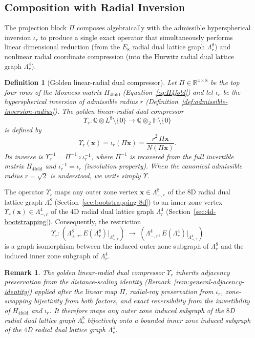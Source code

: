\documentclass{article}
\newtheorem{definition}{Definition}
\newtheorem{remark}{Remark}
\begin{document}
\subsection{Composition with Radial Inversion}
\label{sec:h4-folding:dual-wield}

The projection block \(\Pi\) composes algebraically with the admissible hyperspherical inversion \(\iota_r\) to produce a single exact operator that simultaneously performs linear dimensional reduction (from the \(E_8\) radial dual lattice graph \(\Lambda_r^8\)) and nonlinear radial coordinate compression (into the Hurwitz radial dual lattice graph \(\Lambda_r^4\)).

\begin{definition}[Golden linear-radial dual compressor]
\label{def:golden-linear-radial-dual-compressor}
Let \(\Pi \in \mathbb{R}^{4\times 8}\) be the top four rows of the Moxness matrix \(H_{4\mathrm{fold}}\) (Equation~\eqref{eq:H4fold}) and let \(\iota_r\) be the hyperspherical inversion of admissible radius \(r\) (Definition~\ref{def:admissible-inversion-radius}). The \emph{golden linear-radial dual compressor}
\[
\Upsilon_r \colon \mathbb{Q}\otimes L^8 \setminus \{0\} \to \mathbb{Q}\otimes_{\mathbb{Z}}\mathbb{H} \setminus \{0\}
\]
is defined by
\[
\Upsilon_r(\mathbf{x}) = \iota_r(\Pi\mathbf{x}) = \frac{r^2 \, \Pi\mathbf{x}}{N(\Pi\mathbf{x})}.
\]
Its inverse is \(\Upsilon_r^{-1} = \Pi^{-1} \circ \iota_r^{-1}\), where \(\Pi^{-1}\) is recovered from the full invertible matrix \(H_{4\mathrm{fold}}\) and \(\iota_r^{-1} = \iota_r\) (involution property). When the canonical admissible radius \(r = \sqrt{2}\) is understood, we write simply \(\Upsilon\).
\end{definition}

The operator \(\Upsilon_r\) maps any outer zone vertex \(\mathbf{x} \in \Lambda_{+,r}^8\) of the \(8\)D radial dual lattice graph \(\Lambda_r^8\) (Section~\ref{sec:bootstrapping-8d}) to an inner zone vertex \(\Upsilon_r(\mathbf{x}) \in \Lambda_{-,r}^4\) of the \(4\)D radial dual lattice graph \(\Lambda_r^4\) (Section~\ref{sec:4d-bootstrapping}). Consequently, the restriction
\[
\Upsilon_r \colon (\Lambda_{+,r}^8, E(\Lambda_r^8)|_{\Lambda_{+,r}^8}) \;\to\; (\Lambda_{-,r}^4, E(\Lambda_r^4)|_{\Lambda_{-,r}^4})
\]
is a graph isomorphism between the induced outer zone subgraph of \(\Lambda_r^8\) and the induced inner zone subgraph of \(\Lambda_r^4\).

\begin{remark}
The golden linear-radial dual compressor \(\Upsilon_r\) inherits adjacency preservation from the distance-scaling identity (Remark~\ref{rem:general-adjacency-identity}) applied after the linear map \(\Pi\), radial-ray preservation from \(\iota_r\), zone-swapping bijectivity from both factors, and exact reversibility from the invertibility of \(H_{4\mathrm{fold}}\) and \(\iota_r\). It therefore maps any outer zone induced subgraph of the \(8\)D radial dual lattice graph \(\Lambda_r^8\) bijectively onto a bounded inner zone induced subgraph of the \(4\)D radial dual lattice graph \(\Lambda_r^4\).
\end{remark}
\end{document}
